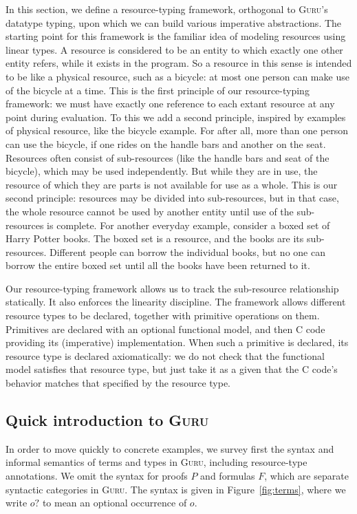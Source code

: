 \documentclass[9pt,natbib]{sigplanconf}
\begin{document}
In this section, we define a resource-typing framework, orthogonal to
\textsc{Guru}'s datatype typing, upon which we can build various
imperative abstractions.  The starting point for this framework is the
familiar idea of modeling resources using linear types.  A resource is
considered to be an entity to which exactly one other entity refers,
while it exists in the program.  So a resource in this sense is
intended to be like a physical resource, such as a bicycle: at most
one person can make use of the bicycle at a time.  This is the first
principle of our resource-typing framework: we must have exactly one
reference to each extant resource at any point during evaluation.  To
this we add a second principle, inspired by examples of physical
resource, like the bicycle example.  For after all, more than one
person can use the bicycle, if one rides on the handle bars and
another on the seat.  Resources often consist of sub-resources (like
the handle bars and seat of the bicycle), which may be used
independently.  But while they are in use, the resource of which they
are parts is not available for use as a whole.  This is our second
principle: resources may be divided into sub-resources, but in that
case, the whole resource cannot be used by another entity until use of
the sub-resources is complete.  For another everyday example, consider
a boxed set of Harry Potter books.  The boxed set is a resource, and
the books are its sub-resources.  Different people can borrow the
individual books, but no one can borrow the entire boxed set until all
the books have been returned to it.

Our resource-typing framework allows us to track the sub-resource
relationship statically.  It also enforces the linearity discipline.
The framework allows different resource types to be declared, together
with primitive operations on them.  Primitives are declared with an
optional functional model, and then C code providing its (imperative)
implementation.  When such a primitive is declared, its resource type
is declared axiomatically: we do not check that the functional model
satisfies that resource type, but just take it as a given that the C
code's behavior matches that specified by the resource type.

\subsection{Quick introduction to \textsc{Guru}}

In order to move quickly to concrete examples, we survey first the
syntax and informal semantics of terms and types in \textsc{Guru},
including resource-type annotations.  We omit the syntax for proofs
$P$ and formulas $F$, which are separate syntactic categories in
\textsc{Guru}.  The syntax is given in Figure~\ref{fig:terms}, where
we write $o?$ to mean an optional occurrence of $o$.
\end{document}
